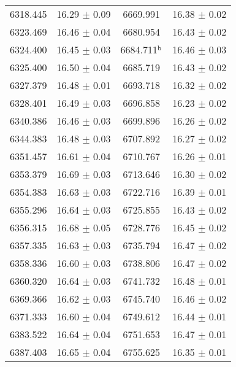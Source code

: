 \documentclass[iop]{emulateapj}
\begin{document}
\begin{table}
\begin{tabular}{cccc}
   6318.445  &   16.29  $\pm$    0.09        &    6669.991  &   16.38  $\pm$    0.02          \\
   6323.469  &   16.46  $\pm$    0.04        &    6680.954  &   16.43  $\pm$    0.02          \\
   6324.400  &   16.45  $\pm$    0.03        &    6684.711$\rm^b$  &   16.46  $\pm$    0.03   \\
   6325.400  &   16.50  $\pm$    0.04        &    6685.719  &   16.43  $\pm$    0.02          \\
   6327.379  &   16.48  $\pm$    0.01        &    6693.718  &   16.32  $\pm$    0.02          \\
   6328.401  &   16.49  $\pm$    0.03        &    6696.858  &   16.23  $\pm$    0.02          \\
   6340.386  &   16.46  $\pm$    0.03        &    6699.896  &   16.26  $\pm$    0.02          \\
   6344.383  &   16.48  $\pm$    0.03        &    6707.892  &   16.27  $\pm$    0.02          \\
   6351.457  &   16.61  $\pm$    0.04        &    6710.767  &   16.26  $\pm$    0.01          \\
   6353.379  &   16.69  $\pm$    0.03        &    6713.646  &   16.30  $\pm$    0.02          \\
   6354.383  &   16.63  $\pm$    0.03        &    6722.716  &   16.39  $\pm$    0.01          \\
   6355.296  &   16.64  $\pm$    0.03        &    6725.855  &   16.43  $\pm$    0.02          \\
   6356.315  &   16.68  $\pm$    0.05        &    6728.776  &   16.45  $\pm$    0.02          \\
   6357.335  &   16.63  $\pm$    0.03        &    6735.794  &   16.47  $\pm$    0.02		  \\
   6358.336  &   16.60  $\pm$    0.03        &    6738.806  &   16.47  $\pm$    0.02          \\
   6360.320  &   16.64  $\pm$    0.03        &    6741.732  &   16.48  $\pm$    0.01          \\
   6369.366  &   16.62  $\pm$    0.03        &    6745.740  &   16.46  $\pm$    0.02          \\
   6371.333  &   16.60  $\pm$    0.04        &    6749.612  &   16.44  $\pm$    0.01          \\
   6383.522  &   16.64  $\pm$    0.04        &    6751.653  &   16.47  $\pm$    0.01          \\
   6387.403  &   16.65  $\pm$    0.04        &    6755.625  &   16.35  $\pm$    0.01          \\

\end{tabular}
\end{table}
\end{document}
